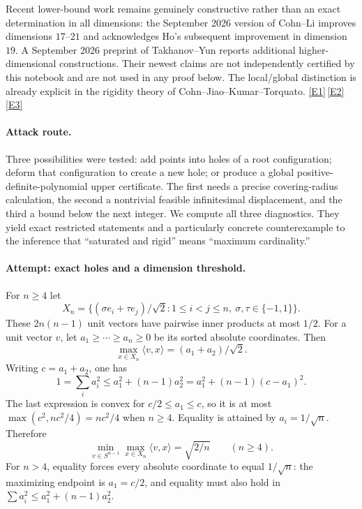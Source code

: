 \documentclass[11pt,a4paper]{article}
\newcommand{\eref}[2]{\hyperlink{extra:#1:#2}{[E#2]}}
\numberwithin{equation}{section}
\begin{document}
Recent lower-bound work remains genuinely constructive rather than an
exact determination in all dimensions: the September 2026 version of
Cohn--Li improves dimensions $17$--$21$ and acknowledges Ho's subsequent
improvement in dimension $19$. A September 2026 preprint of Takhanov--Yun
reports additional higher-dimensional constructions. Their newest claims
are not independently certified by this notebook and are not used in any
proof below. The local/global distinction is already explicit in the
rigidity theory of Cohn--Jiao--Kumar--Torquato. \eref{1369}{1}\,\eref{1369}{2}\,\eref{1369}{3}

\paragraph{Attack route.}
Three possibilities were tested: add points into holes of a root
configuration; deform that configuration to create a new hole; or produce
a global positive-definite-polynomial upper certificate. The first needs
a precise covering-radius calculation, the second a nontrivial feasible
infinitesimal displacement, and the third a bound below the next integer.
We compute all three diagnostics. They yield exact restricted statements
and a particularly concrete counterexample to the inference that
``saturated and rigid'' means ``maximum cardinality.''

\paragraph{Attempt: exact holes and a dimension threshold.}
For $n\geq4$ let
\[
 X_n=\{(\sigma e_i+\tau e_j)/\sqrt2:
           1\leq i<j\leq n,\ \sigma,\tau\in\{-1,1\}\}.
\]
These $2n(n-1)$ unit vectors have pairwise inner products at most $1/2$.
For a unit vector $v$, let $a_1\geq\cdots\geq a_n\geq0$ be its sorted
absolute coordinates. Then
\begin{equation}\label{1369:support}
 \max_{x\in X_n}\langle v,x\rangle=(a_1+a_2)/\sqrt2.
\end{equation}
Writing $c=a_1+a_2$, one has
\[
 1=\sum_i a_i^2\leq a_1^2+(n-1)a_2^2
             =a_1^2+(n-1)(c-a_1)^2.
\]
The last expression is convex for $c/2\leq a_1\leq c$, so it is at most
$\max(c^2,nc^2/4)=nc^2/4$ when $n\geq4$. Equality is attained by
$a_i=1/\sqrt n$. Therefore
\begin{equation}\label{1369:cover}
 \min_{v\in S^{n-1}}\max_{x\in X_n}\langle v,x\rangle
       =\sqrt{2/n}\qquad(n\geq4).
\end{equation}
For $n>4$, equality forces every absolute coordinate to equal
$1/\sqrt n$: the maximizing endpoint is $a_1=c/2$, and equality must
also hold in $\sum a_i^2\leq a_1^2+(n-1)a_2^2$.
\end{document}
